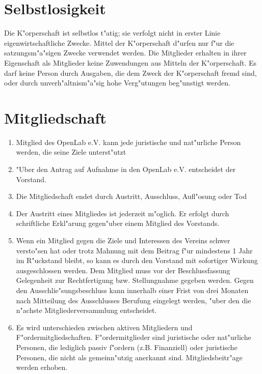 \documentclass[a5paper, ngerman, 10pt]{scrreprt}
\begin{document}
\section{Selbstlosigkeit}
Die K"orperschaft ist selbstlos t"atig; sie verfolgt nicht in erster Linie
eigenwirtschaftliche Zwecke. Mittel der K"orperschaft d"urfen nur f"ur die
satzungsm"a"sigen Zwecke verwendet werden. Die Mitglieder erhalten in ihrer
Eigenschaft als Mitglieder keine Zuwendungen aus Mitteln der K"orperschaft. Es
darf keine Person durch Ausgaben, die dem Zweck der K"orperschaft fremd sind,
oder durch unverh"altnism"a"sig hohe Verg"utungen beg"unstigt werden.


\section{Mitgliedschaft}
\begin{enumerate}[(1)]
    \item Mitglied des OpenLab e.V. kann jede juristische und nat"urliche Person
        werden, die seine Ziele unterst"utzt
    \item "Uber den Antrag auf Aufnahme in den OpenLab e.V. entscheidet der
        Vorstand.
    \item Die Mitgliedschaft endet durch Austritt, Ausschluss, Aufl"osung oder
        Tod
    \item Der Austritt eines Mitgliedes ist jederzeit m"oglich. Er erfolgt durch
        schriftliche Erkl"arung gegen"uber einem Mitglied des Vorstands.
    \item Wenn ein Mitglied gegen die Ziele und Interessen des Vereins schwer
        versto"sen hat oder trotz Mahnung mit dem Beitrag f"ur mindestens 1 Jahr
        im R"uckstand bleibt, so kann es durch den Vorstand mit sofortiger
        Wirkung ausgeschlossen werden. Dem Mitglied muss vor der
        Beschlussfassung Gelegenheit zur Rechtfertigung bzw. Stellungnahme
        gegeben werden. Gegen den Ausschlie"sungsbeschluss kann innerhalb einer
        Frist von drei Monaten nach Mitteilung des Ausschlusses Berufung
        eingelegt werden, "uber den die n"achste Mitgliederversammlung
        entscheidet.
    \item Es wird unterschieden zwischen aktiven Mitgliedern und
        F"ordermitgliedschaften. F"ordermitglieder sind juristische oder
        nat"urliche Personen, die lediglich passiv f"ordern (z.B. Finanziell)
        oder juristische Personen, die nicht als gemeinn"utzig anerkannt sind.
        Mitgliedsbeitr"age werden erhoben.
\end{enumerate}
\end{document}
